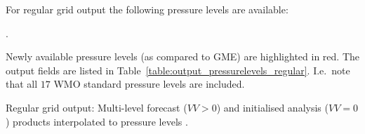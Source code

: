 For regular grid output the following pressure levels are available: 
\begin{center}
\begin{minipage}{0.5\linewidth}
\pressurelevelsRegular. 
\end{minipage}
\end{center}


Newly available pressure levels (as compared to GME) are highlighted in red. 
The output fields are listed in Table~\ref{table:output_pressurelevels_regular}.
I.e.\ note that all $17$ WMO standard pressure levels are included.

\renewcommand{\new}[1]{#1}

\begin{vartable}{\caption{Regular grid output:
      Multi-level forecast ($VV>0$) and initialised analysis ($VV=0$) products 
      interpolated to pressure levels \pressurelevelsRegular.}\label{table:output_pressurelevels_regular}}
  

\end{vartable}
